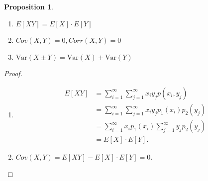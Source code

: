 \documentclass[12pt,openany]{book}
\newtheorem{proposition}[theorem]{Proposition}
\theoremstyle{definition}
\newcommand{\Var}{\text{Var}}
\newcommand{\Cov}{\textit{Cov}}
\newcommand{\Corr}{\textit{Corr}}
\begin{document}
	\vspace{10pt}
	\begin{tcolorbox}[colback=white,colframe=procolor,arc=5pt,title={\color{white}\bf Two Probability Variables are Independent}]
		\begin{proposition}
			\ \begin{enumerate}[(1)]
			\item \(E[XY]=E[X]\cdot E[Y] \)
			\item \(\Cov(X,Y)=0, \Corr(X,Y)=0 \)
			\item \(\Var(X\pm Y)=\Var(X)+\Var(Y) \)
		\end{enumerate}
		\end{proposition}
	\end{tcolorbox}
	\begin{proof}
		\begin{enumerate}[(1)]
			\item \begin{align*}
				E[XY] &= \sum_{i=1}^\infty\sum_{j=1}^\infty x_iy_jp(x_i,y_j) \\
				&= \sum_{i=1}^\infty\sum_{j=1}^\infty x_iy_jp_1(x_i)p_2(y_j) \\
				&= \sum_{i=1}^\infty x_ip_1(x_i)\sum_{j=1}^\infty y_jp_2(y_j)  \\
				&=E[X]\cdot E[Y].
			\end{align*} 
			\item $\Cov(X,Y) = E[XY]-E[X]\cdot E[Y]=0$.
		\end{enumerate}
	\end{proof}
	
	\newpage
\end{document}
